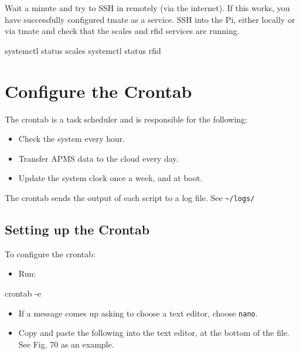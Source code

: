 \documentclass[
  letterpaper,
]{scrbook}
\newenvironment{Shaded}{\begin{snugshade}}{\end{snugshade}}
\newcommand{\AttributeTok}[1]{\textcolor[rgb]{0.40,0.45,0.13}{#1}}
\newcommand{\ExtensionTok}[1]{\textcolor[rgb]{0.00,0.23,0.31}{#1}}
\newcommand{\FunctionTok}[1]{\textcolor[rgb]{0.28,0.35,0.67}{#1}}
\newcommand{\NormalTok}[1]{\textcolor[rgb]{0.00,0.23,0.31}{#1}}
\providecommand{\tightlist}{%
  \setlength{\itemsep}{0pt}\setlength{\parskip}{0pt}}
\begin{document}
Wait a minute and try to SSH in remotely (via the internet). If this
works, you have successfully configured tmate as a service. SSH into the
Pi, either locally or via tmate and check that the scales and rfid
services are running.

\begin{Shaded}
\begin{Highlighting}[]
\ExtensionTok{systemctl}\NormalTok{ status scales}
\ExtensionTok{systemctl}\NormalTok{ status rfid}
\end{Highlighting}
\end{Shaded}

\chapter{Configure the Crontab}\label{configure-the-crontab}

The crontab is a task scheduler and is responsible for the following:

\begin{itemize}
\item
  Check the system every hour.
\item
  Transfer APMS data to the cloud every day.
\item
  Update the system clock once a week, and at boot.
\end{itemize}

The crontab sends the output of each script to a log file. See
\texttt{\textasciitilde{}/logs/}

\section{Setting up the Crontab}\label{setting-up-the-crontab}

To configure the crontab:

\begin{itemize}
\tightlist
\item
  Run:
\end{itemize}

\begin{Shaded}
\begin{Highlighting}[]
\FunctionTok{crontab} \AttributeTok{{-}e}
\end{Highlighting}
\end{Shaded}

\begin{itemize}
\item
  If a message comes up asking to choose a text editor, choose
  \texttt{nano}.
\item
  Copy and paste the following into the text editor, at the bottom of
  the file. See Fig. 70 as an example.
\end{itemize}
\end{document}
